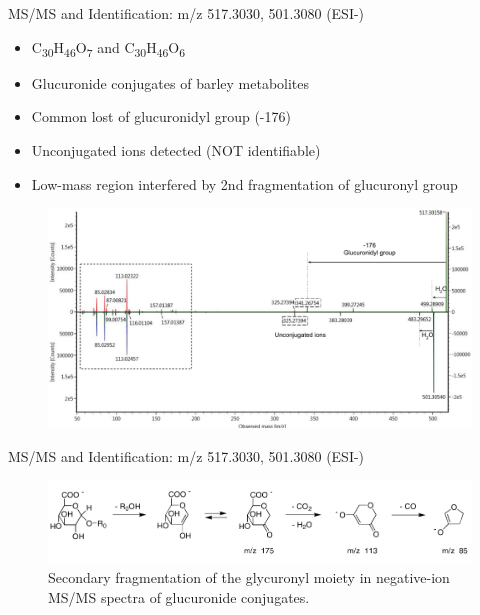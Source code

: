 \documentclass{beamer}
\begin{document}
\begin{frame}{MS/MS and Identification: m/z 517.3030, 501.3080 (ESI-)}
\begin{itemize}
\item C\textsubscript{30}H\textsubscript{46}O\textsubscript{7} and C\textsubscript{30}H\textsubscript{46}O\textsubscript{6}
\item Glucuronide conjugates of barley metabolites
\item Common lost of glucuronidyl group (-176)
\item Unconjugated ions detected (NOT identifiable)
\item Low-mass region interfered by 2nd fragmentation of glucuronyl group
\end{itemize}
\begin{figure}[h]
    \centering
    \includegraphics[scale=0.38]{images/501517compare.pdf}

    \label{fig:501517compare}
\end{figure}
\end{frame}
\begin{frame}{MS/MS and Identification: m/z 517.3030, 501.3080 (ESI-)}
\begin{figure}[h!]
    \centering
    \includegraphics[scale=0.40]{images/gluco_frag.PNG}
    \caption{Secondary fragmentation of the glycuronyl moiety in negative-ion MS/MS spectra of glucuronide conjugates.}
    \label{fig:gluco_frag.PNG}
\end{figure}
\end{frame}
\end{document}
